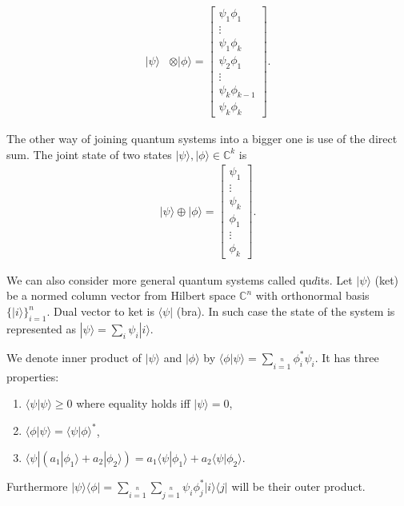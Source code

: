 \documentclass[a4paper,10pt]{llncs}
\newcommand{\ket}[1]{| #1 \rangle}
\newcommand{\bra}[1]{\langle #1 |}
\newcommand{\ketbra}[2]{| #1 \rangle \langle #2 |}
\newcommand{\braket}[2]{\bra{#2}{#1}\rangle}
\newcommand{\1}{\mathbb{1}}
\begin{document}
\begin{equation}
\begin{split}
\ket{\psi}&\otimes\ket{\phi}=
\left[\begin{array}{c}
\psi_1\phi_1\\
\vdots\\
\psi_1\phi_k\\
\psi_2\phi_1\\
\vdots\\
\psi_k\phi_{k-1}\\
\psi_k\phi_k
\end{array}\right].
\end{split}
\end{equation}


The other way of joining quantum systems into a bigger one is use of the direct 
sum. The joint state of two states $\ket{\psi}, 
\ket{\phi}\in\mathbb{C}^k$ 
is
\begin{equation}
\begin{split}
\ket{\psi}\oplus\ket{\phi} =
\left[\begin{array}{c}
\psi_1\\
\vdots\\
\psi_k\\
\phi_1\\
\vdots\\
\phi_k
\end{array}\right].
\end{split}
\end{equation}


We can also consider more general quantum systems called qu$d$its.
Let $\ket{\psi}$ (ket) be a normed column vector from Hilbert space
$\mathbb{C}^n$ with orthonormal basis $\{\ket{i}\}_{i=1}^n$. Dual vector to 
ket
is $\bra{\psi}$ (bra). In such case the state of the system is represented as 
$\ket{\psi}=\sum_i \psi_i 
\ket{i}$.

We denote inner
product of $\ket{\psi}$ and $\ket{\phi}$
by
$\braket{\psi}{\phi}=\sum\limits_{i=1}\limits^{n}\phi_i^*\psi_i.$ 
 It has three properties:
\begin{enumerate}
\item $\braket{\psi}{\psi}\geq 0$ where equality holds iff $\ket{\psi}=0$,
\item $\braket{\psi}{\phi}=\braket{\phi}{\psi}^*$,
\item 
$\bra{\psi}(a_1\ket{\phi_1}+a_2\ket{\phi_2})=a_1\braket{\phi_1}{\psi}+a_2\braket{\phi_2}{\psi}$.
\end{enumerate} 
Furthermore
$\ketbra{\psi}{\phi}=\sum\limits_{i=1}\limits^n\sum\limits_{j=1}\limits^n\psi_i\phi_j^*\ketbra{i}{j}$
 will be their outer product.
\end{document}

